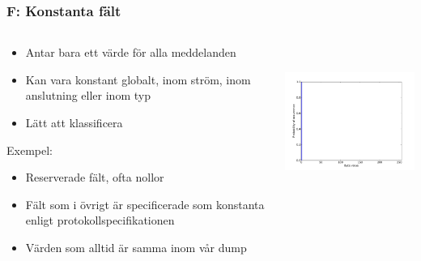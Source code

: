 \documentclass[xetex, 8pt]{beamer}
\begin{document}
    \begin{frame}
        \frametitle{F: Konstanta fält}
        \begin{columns}[t]
            \begin{column}[T]{6cm}
                \begin{itemize}
                    \item Antar bara ett värde för alla meddelanden
                    \item Kan vara konstant globalt, inom ström, inom
                        anslutning eller inom typ
                    \item Lätt att klassificera
                \end{itemize}
                Exempel:
                \begin{itemize}
                    \item Reserverade fält, ofta nollor
                    \item Fält som i övrigt är specificerade som konstanta
                        enligt protokollspecifikationen
                    \item Värden som alltid är samma inom vår dump
                \end{itemize}
            \end{column}
            \begin{column}[T]{6cm}
                \includegraphics[height=5cm]{img/const_one.pdf}
            \end{column}
        \end{columns}
    \end{frame}
\end{document}
